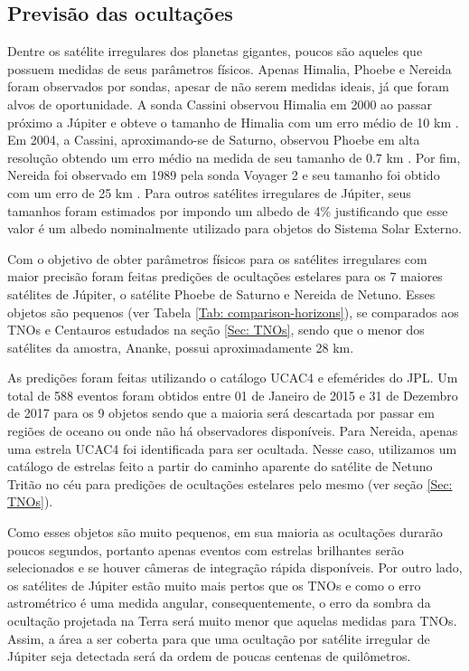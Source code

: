 \documentclass[12pt,a4paper]{monografia}
\begin{document}
\subsection{Previs\~ao das ocultaç\~oes}

\indent \indent Dentre os satélite irregulares dos planetas gigantes, poucos são aqueles que possuem medidas de seus parâmetros físicos. Apenas Himalia, Phoebe e Nereida foram observados por sondas, apesar de não serem medidas ideais, já que foram alvos de oportunidade. A sonda Cassini observou Himalia em 2000 ao passar próximo a Júpiter e obteve o tamanho de Himalia com um erro médio de 10 km \citep{Porco2003}. Em 2004, a Cassini, aproximando-se de Saturno, observou Phoebe em alta resolução obtendo um erro médio na medida de seu tamanho de 0.7 km \citep{Thomas2010}. Por fim, Nereida foi observado em 1989 pela sonda Voyager 2 e seu tamanho foi obtido com um erro de 25 km \citep{Smith1989}. Para outros satélites irregulares de Júpiter, seus tamanhos foram estimados por \cite{Rettig2001} impondo um albedo de 4\% justificando que esse valor é um albedo nominalmente utilizado para objetos do Sistema Solar Externo.

Com o objetivo de obter parâmetros físicos para os satélites irregulares com maior precisão foram feitas predições de ocultações estelares para os 7 maiores satélites de Júpiter, o satélite Phoebe de Saturno e Nereida de Netuno. Esses objetos são pequenos (ver Tabela \ref{Tab: comparison-horizons}), se comparados aos TNOs e Centauros estudados na seção \ref{Sec: TNOs}, sendo que o menor dos satélites da amostra, Ananke, possui aproximadamente 28 km.

As predições foram feitas utilizando o catálogo UCAC4 e efemérides do JPL. Um total de 588 eventos foram obtidos entre 01 de Janeiro de 2015 e 31 de Dezembro de 2017 para os 9 objetos sendo que a maioria será descartada por passar em regiões de oceano ou onde não há observadores disponíveis. Para Nereida, apenas uma estrela UCAC4 foi identificada para ser ocultada. Nesse caso, utilizamos um catálogo de estrelas feito a partir do caminho aparente do satélite de Netuno Tritão no céu para predições de ocultações estelares pelo mesmo (ver seção \ref{Sec: TNOs}).

Como esses objetos são muito pequenos, em sua maioria as ocultações durarão poucos segundos, portanto apenas eventos com estrelas brilhantes serão selecionados e se houver câmeras de integração rápida disponíveis. Por outro lado, os satélites de Júpiter estão muito mais pertos que os TNOs e como o erro astrométrico é uma medida angular, consequentemente, o erro da sombra da ocultação projetada na Terra será muito menor que aquelas medidas para TNOs. Assim, a área a ser coberta para que uma ocultação por satélite irregular de Júpiter seja detectada será da ordem de poucas centenas de quilômetros.
\end{document}
